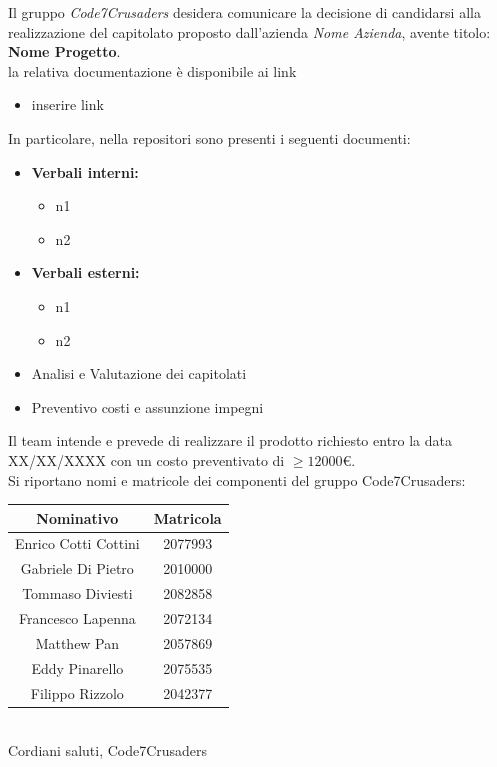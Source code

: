 \documentclass{article}
\begin{document}
Il gruppo \textit{Code7Crusaders} desidera comunicare la decisione di candidarsi alla realizzazione del capitolato proposto dall'azienda \textit{Nome Azienda}, avente titolo: \textbf{Nome Progetto}.
\\
la relativa documentazione è disponibile ai link
\begin{itemize}
    \item inserire link
\end{itemize}
In particolare, nella repositori sono presenti i seguenti documenti:
\begin{itemize}
    \item \textbf{Verbali interni:}
    \begin{itemize}
        \item n1
        \item n2
    \end{itemize}
    \item \textbf{Verbali esterni:}
    \begin{itemize}
        \item n1
        \item n2
    \end{itemize}
    \item Analisi e Valutazione dei capitolati
    \item Preventivo costi e assunzione impegni
\end{itemize}
Il team intende e prevede di realizzare il prodotto richiesto entro la data XX/XX/XXXX con un costo preventivato di $\ge 12000$\euro.
\\
Si riportano nomi e matricole dei componenti del gruppo Code7Crusaders:
\\
\endline
\begin{center}
    \begin{tabular}{|c|c|}
        \hline
        \textbf{Nominativo} & \textbf{Matricola} \\
        \hline
         Enrico Cotti Cottini & 2077993\\
         Gabriele Di Pietro & 2010000\\
         Tommaso Diviesti & 2082858\\
         Francesco Lapenna & 2072134\\
         Matthew Pan & 2057869\\
         Eddy Pinarello & 2075535\\
         Filippo Rizzolo & 2042377\\
         \hline
    \end{tabular}
\end{center}
\\
Cordiani saluti, Code7Crusaders
\end{document}
